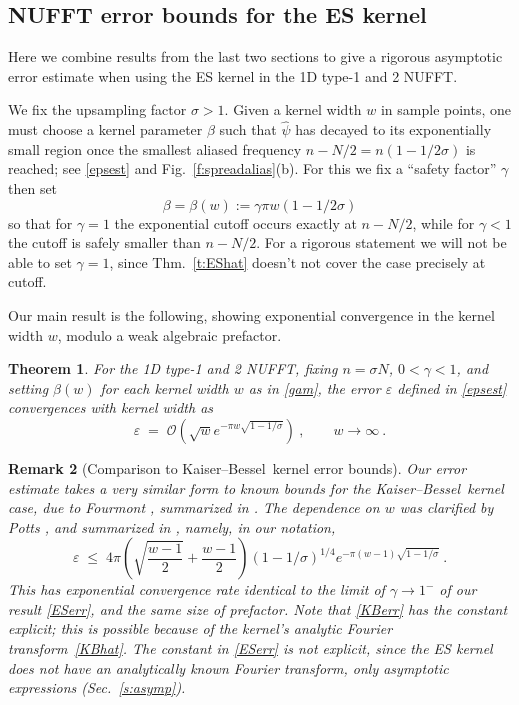 \documentclass[10pt]{article}
\newcommand{\be}{\begin{equation}}
\newcommand{\ee}{\end{equation}}
\newcommand{\eps}{\varepsilon}
\newcommand{\bigO}{{\mathcal O}}
\newtheorem{thm}{Theorem}
\newtheorem{rmk}[thm]{Remark}
\newcommand{\freq}{\beta}          %
\newcommand{\rat}{\sigma}          %
\newcommand{\KB}{Kaiser--Bessel}
\newcommand{\FT}{Fourier transform}
\begin{document}
\subsection{NUFFT error bounds for the ES kernel}

Here we combine results from the last two sections to give a rigorous
asymptotic error estimate when using the ES kernel in the 1D
type-1 and 2 NUFFT.

We fix the upsampling factor $\rat>1$.
Given a kernel width $w$ in sample points, one must choose
a kernel parameter $\freq$ such that $\hat\psi$ has decayed to its
exponentially small region once the smallest aliased
frequency $n-N/2 = n(1-1/2\rat)$ is reached; see \eqref{epsest} and
Fig.~\ref{f:spreadalias}(b).
For this we fix a ``safety factor'' $\gamma$ then set
\be
\freq = \freq(w) := \gamma \pi w (1-1/2\rat)
\label{gam}
\ee
so that for $\gamma=1$ the exponential cutoff occurs exactly at $n-N/2$,
while for $\gamma<1$ the cutoff is safely smaller than $n-N/2$.
For a rigorous statement we will not be able to set
$\gamma=1$, since Thm.~\ref{t:EShat}
doesn't not cover the case precisely at cutoff.


Our main result is the following, showing exponential convergence
in the kernel width $w$, modulo a weak algebraic prefactor.
\begin{thm} %
  For the 1D type-1 and 2 NUFFT, fixing $n=\sigma N$,
  $0<\gamma<1$, and setting $\freq(w)$ for each kernel width
  $w$ as in \eqref{gam},
  the error $\eps$ defined in \eqref{epsest} convergences with kernel width
  as
  \be
  \eps \;=\; \bigO\left( \sqrt{w} e^{-\pi w \sqrt{1-1/\rat}}
  \right)
  ~, \qquad w\to \infty ~.
  \label{ESerr}
  \ee
  \label{t:ESerr}
\end{thm}  %

\begin{rmk}[Comparison to \KB\ kernel error bounds]
  \label{fourmont}
  Our error estimate takes a very similar form to known bounds
  for the \KB\ kernel case, due to Fourmont \cite[p.~30-38]{fourmontthesis},
  summarized in \cite[Sec.~4]{fourmont}.
  The dependence on $w$ was clarified by Potts \cite[p.~30-31]{pottshabil},
  and summarized in \cite[App.~C]{nfft}, namely, in our notation,
  \be
  \eps \;\le\; 4\pi \left(\sqrt{\frac{w-1}{2}}+\frac{w-1}{2}\right)
  (1-1/\rat)^{1/4} e^{-\pi(w-1)\sqrt{1-1/\rat}}
  ~.
  \label{KBerr}
  \ee
  This has exponential convergence rate identical to the limit of
  $\gamma\to1^{-}$ of our result \eqref{ESerr}, and the same size of prefactor.
  Note that \eqref{KBerr} has the constant explicit; this is possible because
  of the kernel's analytic \FT\ \eqref{KBhat}.
  The constant in \eqref{ESerr} is not explicit, since the ES kernel does not
  have an analytically known \FT, only asymptotic expressions
  (Sec.~\ref{s:asymp}).
\end{rmk}
\end{document}
